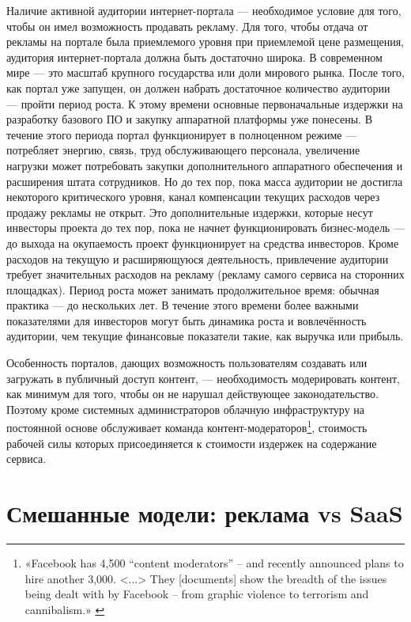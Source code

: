 \documentclass{article}
\begin{document}
Наличие активной аудитории интернет-портала — необходимое условие для того, чтобы он имел возможность продавать рекламу. Для того, чтобы отдача от рекламы на портале была приемлемого уровня при приемлемой цене размещения, аудитория интернет-портала должна быть достаточно широка. В современном мире — это масштаб крупного государства или доли мирового рынка. После того, как портал уже запущен, он должен набрать достаточное количество аудитории — пройти период роста. К этому времени основные первоначальные издержки на разработку базового ПО и закупку аппаратной платформы уже понесены. В течение этого периода портал функционирует в полноценном режиме — потребляет энергию, связь, труд обслуживающего персонала, увеличение нагрузки может потребовать закупки дополнительного аппаратного обеспечения и расширения штата сотрудников. Но до тех пор, пока масса аудитории не достигла некоторого критического уровня, канал компенсации текущих расходов через продажу рекламы не открыт. Это дополнительные издержки, которые несут инвесторы проекта до тех пор, пока не начнет функционировать бизнес-модель — до выхода на окупаемость проект функционирует на средства инвесторов. Кроме расходов на текущую и расширяющуюся деятельность, привлечение аудитории требует значительных расходов на рекламу (рекламу самого сервиса на сторонних площадках). Период роста может занимать продолжительное время: обычная практика — до нескольких лет. В течение этого времени более важными показателями для инвесторов могут быть динамика роста и вовлечённость аудитории, чем текущие финансовые показатели такие, как выручка или прибыль.

Особенность порталов, дающих возможность пользователям создавать или загружать в публичный доступ контент, — необходимость модерировать контент, как минимум для того, чтобы он не нарушал действующее законодательство. Поэтому кроме системных администраторов облачную инфраструктуру на постоянной основе обслуживает команда контент-модераторов\footnote{«Facebook has 4,500 “content moderators” – and recently announced plans to hire another 3,000. <...> They [documents] show the breadth of the issues being dealt with by Facebook – from graphic violence to terrorism and cannibalism.» \cite{facebookModerators}}, стоимость рабочей силы которых присоединяется к стоимости издержек на содержание сервиса.

\section*{Смешанные модели: реклама vs SaaS}
\end{document}
